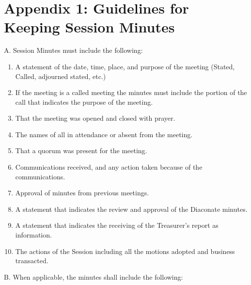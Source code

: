 \documentclass[
]{book}
\providecommand{\tightlist}{%
  \setlength{\itemsep}{0pt}\setlength{\parskip}{0pt}}
\begin{document}
\hypertarget{appendix-1-guidelines-for-keeping-session-minutes}{%
\section{Appendix 1: Guidelines for Keeping Session Minutes}\label{appendix-1-guidelines-for-keeping-session-minutes}}

A. Session Minutes must include the following:

\begin{enumerate}
\def\labelenumi{\arabic{enumi}.}
\tightlist
\item
  A statement of the date, time, place, and purpose of the meeting (Stated, Called, adjourned stated, etc.)
\item
  If the meeting is a called meeting the minutes must include the portion of the call that indicates the purpose of the meeting.
\item
  That the meeting was opened and closed with prayer.
\item
  The names of all in attendance or absent from the meeting.
\item
  That a quorum was present for the meeting.
\item
  Communications received, and any action taken because of the communications.
\item
  Approval of minutes from previous meetings.
\item
  A statement that indicates the review and approval of the Diaconate minutes.
\item
  A statement that indicates the receiving of the Treasurer's report as information.
\item
  The actions of the Session including all the motions adopted and business transacted.
\end{enumerate}

B. When applicable, the minutes shall include the following:
\end{document}
